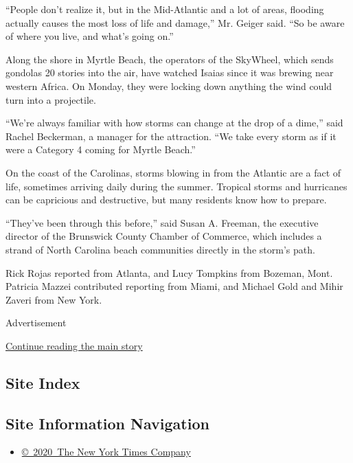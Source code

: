 ``People don't realize it, but in the Mid-Atlantic and a lot of areas,
flooding actually causes the most loss of life and damage,'' Mr. Geiger
said. ``So be aware of where you live, and what's going on.''

Along the shore in Myrtle Beach, the operators of the SkyWheel, which
sends gondolas 20 stories into the air, have watched Isaias since it was
brewing near western Africa. On Monday, they were locking down anything
the wind could turn into a projectile.

``We're always familiar with how storms can change at the drop of a
dime,'' said Rachel Beckerman, a manager for the attraction. ``We take
every storm as if it were a Category 4 coming for Myrtle Beach.''

On the coast of the Carolinas, storms blowing in from the Atlantic are a
fact of life, sometimes arriving daily during the summer. Tropical
storms and hurricanes can be capricious and destructive, but many
residents know how to prepare.

``They've been through this before,'' said Susan A. Freeman, the
executive director of the Brunswick County Chamber of Commerce, which
includes a strand of North Carolina beach communities directly in the
storm's path.

Rick Rojas reported from Atlanta, and Lucy Tompkins from Bozeman, Mont.
Patricia Mazzei contributed reporting from Miami, and Michael Gold and
Mihir Zaveri from New York.

Advertisement

\protect\hyperlink{after-bottom}{Continue reading the main story}

\hypertarget{site-index}{%
\subsection{Site Index}\label{site-index}}

\hypertarget{site-information-navigation}{%
\subsection{Site Information
Navigation}\label{site-information-navigation}}

\begin{itemize}
\tightlist
\item
  \href{https://help.nytimes.com/hc/en-us/articles/115014792127-Copyright-notice}{©~2020~The
  New York Times Company}
\end{itemize}

